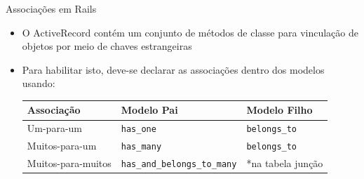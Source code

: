 \begin{frame}{Associações em Rails}
\begin{itemize}
		\item O ActiveRecord contém um conjunto de métodos de classe para
		\alert{vinculação} de objetos por meio de \alert{chaves estrangeiras}
		
		\item Para habilitar isto, deve-se declarar as \alert{associações} dentro dos modelos
		usando:
		\begin{table}[tp] 
			\scriptsize 
			\setlength{\tabcolsep}{8pt}
			\setlength{\extrarowheight}{2pt}   			
			\begin{tabular}{|l|l|l|} 
				\hline
				\textbf{Associação} & \textbf{Modelo Pai} & \textbf{Modelo Filho}\\
				\hline
				Um-para-um & \verb|has_one| & \verb|belongs_to| \\
				\hline
				Muitos-para-um & \verb|has_many| & \verb|belongs_to| \\
				\hline
				Muitos-para-muitos & \verb|has_and_belongs_to_many| & *na tabela junção \\
				\hline
			\end{tabular}
		\end{table}
		
	\end{itemize}	
\end{frame}